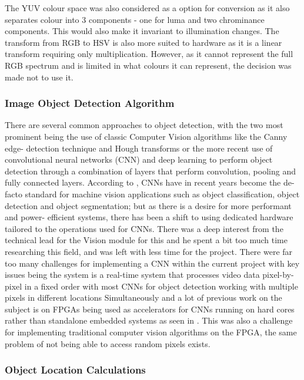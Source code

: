 \documentclass[a4paper]{article}
\begin{document}
The YUV colour space was also considered as a option for conversion as it also
separates colour into 3 components - one for luma and two chrominance components.
This would also make it invariant to illumination changes. The transform from RGB
to HSV is also more suited to hardware as it is a linear transform requiring only
multiplication. However, as it cannot represent the full RGB spectrum and is 
limited in what colours it can represent, the decision was made not to use it.    


\subsubsection{Image Object Detection Algorithm}

There are several common approaches to object detection, with the two most 
prominent being the use of classic Computer Vision algorithms like the Canny edge-
detection technique and Hough transforms or the more recent use of convolutional
neural networks (CNN) and deep learning to perform object detection through a 
combination of layers that perform convolution, pooling and fully connected layers. 
According to \cite{DBLP:journals/corr/abs-1806-01683}, CNNs have in recent years 
become the de-facto standard for machine vision applications such as object 
classification, object detection and object segmentation; but as there is a desire 
for more performant and power- efficient systems, there has been a shift to 
using dedicated hardware tailored to the operations used for CNNs. There was a 
deep interest from the technical lead for the Vision module for this and he spent 
a bit too much time researching this field, and was left with less time for the 
project. There were far too many challenges for implementing a CNN within the 
current project with key issues being the system is a real-time system that 
processes video data pixel-by-pixel in a fixed order with most CNNs for object 
detection working with multiple pixels in different locations Simultaneously and
a lot of previous work on the subject is on FPGAs being used as accelerators for 
CNNs running on hard cores rather than standalone embedded systems as seen in \cite{DBLP:journals/corr/abs-1806-01683}
. This was also a challenge for implementing traditional computer vision 
algorithms on the FPGA,  the same problem of not being able to access random 
pixels exists. 


\subsubsection{Object Location Calculations}
\end{document}

